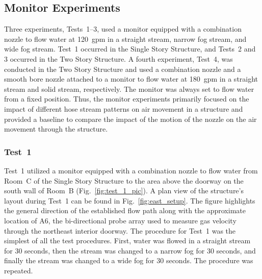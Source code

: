 \documentclass[12pt,oneside]{book}
\begin{document}
\subsection{Monitor Experiments}
\label{sec:monitor_procedure}
Three experiments, Tests~1--3, used a monitor equipped with a combination nozzle to flow water at 120~gpm in a straight stream, narrow fog stream, and wide fog stream. Test~1 occurred in the Single Story Structure, and Tests~2 and 3 occurred in the Two Story Structure. A fourth experiment, Test~4, was conducted in the Two Story Structure and used a combination nozzle and a smooth bore nozzle attached to a monitor to flow water at 180~gpm in a straight stream and solid stream, respectively. The monitor was always set to flow water from a fixed position. Thus, the monitor experiments primarily focused on the impact of different hose stream patterns on air movement in a structure and provided a baseline to compare the impact of the motion of the nozzle on the air movement through the structure.

\subsubsection{Test~1}
Test~1 utilized a monitor equipped with a combination nozzle to flow water from Room~C of the Single Story Structure to the area above the doorway on the south wall of Room~B (Fig.~\ref{fig:test_1_pic}). A plan view of the structure's layout during Test~1 can be found in Fig.~\ref{fig:east_setup}. The figure highlights the general direction of the established flow path along with the approximate location of A6, the bi-directional probe array used to measure gas velocity through the northeast interior doorway. The procedure for Test~1 was the simplest of all the test procedures. First, water was flowed in a straight stream for 30 seconds, then the stream was changed to a narrow fog for 30 seconds, and finally the stream was changed to a wide fog for 30 seconds. The procedure was repeated.
\end{document}

